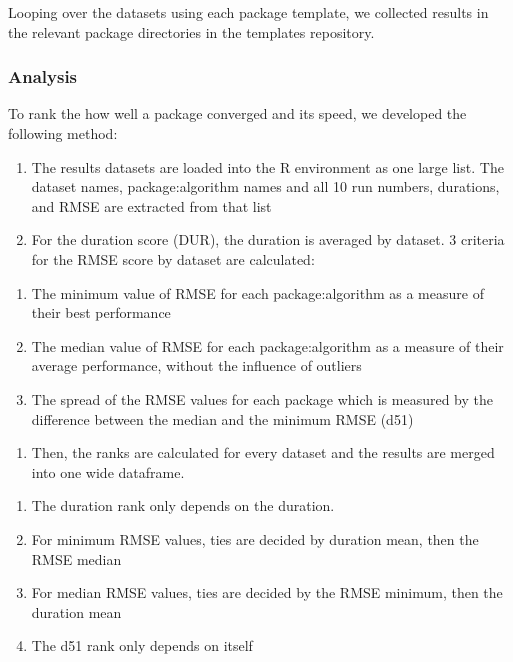 Looping over the datasets using each package template, we collected
results in the relevant package directories in the templates repository.

\hypertarget{analysis}{%
\subsubsection{Analysis}\label{analysis}}

To rank the how well a package converged and its speed, we developed the
following method:

\begin{enumerate}
\def\labelenumi{\arabic{enumi}.}
\tightlist
\item
  The results datasets are loaded into the R environment as one large
  list. The dataset names, package:algorithm names and all 10 run
  numbers, durations, and RMSE are extracted from that list
\item
  For the duration score (DUR), the duration is averaged by dataset. 3
  criteria for the RMSE score by dataset are calculated:
\end{enumerate}

\begin{enumerate}
\def\labelenumi{\alph{enumi}.}
\tightlist
\item
  The minimum value of RMSE for each package:algorithm as a measure of
  their best performance
\item
  The median value of RMSE for each package:algorithm as a measure of
  their average performance, without the influence of outliers
\item
  The spread of the RMSE values for each package which is measured by
  the difference between the median and the minimum RMSE (d51)
\end{enumerate}

\begin{enumerate}
\def\labelenumi{\arabic{enumi}.}
\setcounter{enumi}{2}
\tightlist
\item
  Then, the ranks are calculated for every dataset and the results are
  merged into one wide dataframe.
\end{enumerate}

\begin{enumerate}
\def\labelenumi{\alph{enumi}.}
\tightlist
\item
  The duration rank only depends on the duration.
\item
  For minimum RMSE values, ties are decided by duration mean, then the
  RMSE median
\item
  For median RMSE values, ties are decided by the RMSE minimum, then the
  duration mean
\item
  The d51 rank only depends on itself
\end{enumerate}

